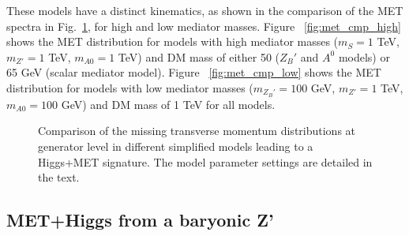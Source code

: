These models have a distinct kinematics, as shown in the comparison of the 
MET spectra in Fig.~\ref{fig:METSimpMonoHiggs}, for high and low mediator masses. 
Figure ~\ref{fig:met_cmp_high} shows the MET distribution 
for models with high mediator masses ($m_{S} = 1$ TeV, $m_{Z'} = 1$ TeV, $m_{A0} = 1$ TeV)
and DM mass of either 50 ($Z_B'$ and $A^0$ models) or 65 GeV (scalar mediator model).
Figure ~\ref{fig:met_cmp_low} shows the MET distribution 
for models with low mediator masses ($m_{Z_B'} = 100$ GeV, $m_{Z'} = 1$ TeV, $m_{A0} = 100$ GeV)
and DM mass of 1 TeV for all models. 

\begin{figure}[hbpt!]
	\centering
	\caption{Comparison of the missing transverse momentum distributions at generator level in different 
		simplified models leading to a Higgs+MET signature. The model parameter settings are detailed in the text.
		\label{fig:METSimpMonoHiggs}}
\end{figure}


\subsection{MET+Higgs from a baryonic Z'}


